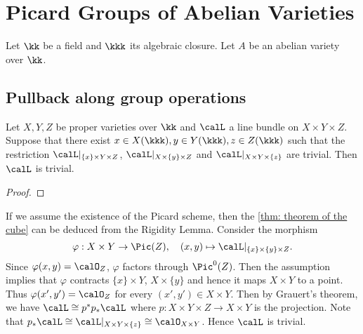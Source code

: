 \section{Picard Groups of Abelian Varieties}

Let \(\kk\) be a field and \(\kkk\) its algebraic closure.
Let \(A\) be an abelian variety over \(\kk\).

\subsection{Pullback along group operations}

        

    \begin{theorem}\label{thm: theorem of the cube}
        Let \(X,Y,Z\) be proper varieties over \(\kk\) and \(\calL\) a line bundle on \(X \times Y \times Z\). 
        Suppose that there exist \(x \in X(\kkk), y \in Y(\kkk), z \in Z(\kkk)\) such that the restriction \(\calL|_{\{x\} \times Y \times Z}\), \(\calL|_{X \times \{y\} \times Z}\) and \(\calL|_{X \times Y \times \{z\}}\) are trivial. 
        Then \(\calL\) is trivial.
    \end{theorem}
    \begin{proof}
    \end{proof}

    \begin{remark}\label{rmk: theorem of the cube by rigidity lemma and picard scheme}
        If we assume the existence of the Picard scheme, then the \cref{thm: theorem of the cube} can be deduced from the Rigidity Lemma.
        Consider the morphism
        \[ \varphi: X \times Y \to \Pic(Z), \quad (x,y) \mapsto \calL|_{\{x\} \times \{y\} \times Z}. \]
        Since \(\varphi(x,y) = \calO_Z\), \(\varphi\) factors through \(\Pic^0(Z)\).
        Then the assumption implies that \(\varphi\) contracts \(\{x\} \times Y\), \(X \times \{y\}\) and hence it maps \(X \times Y\) to a point.
        Thus \(\varphi(x',y') = \calO_Z\) for every \((x',y') \in X \times Y\).
        Then by Grauert's theorem, we have \(\calL \cong p^*p_*\calL\) where \(p: X \times Y \times Z \to X \times Y\) is the projection.
        Note that \(p_*\calL \cong \calL|_{X \times Y \times \{z\}} \cong \calO_{X \times Y}\).
        Hence \(\calL\) is trivial.
    \end{remark}


